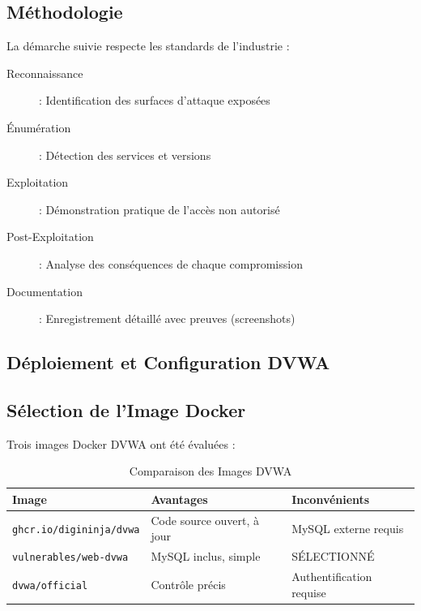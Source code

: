 \documentclass[12pt,a4paper,openany]{report}
\begin{document}
	\subsection{Méthodologie}
	
	La démarche suivie respecte les standards de l'industrie :
	
	\begin{description}
		\item[Reconnaissance] : Identification des surfaces d'attaque exposées
		\item[Énumération] : Détection des services et versions
		\item[Exploitation] : Démonstration pratique de l'accès non autorisé
		\item[Post-Exploitation] : Analyse des conséquences de chaque compromission
		\item[Documentation] : Enregistrement détaillé avec preuves (screenshots)
	\end{description}
	
	
	\subsection{Déploiement et Configuration DVWA}
	
	\subsection{Sélection de l'Image Docker}
	
	Trois images Docker DVWA ont été évaluées :
	
	\begin{table}[ht]
		\centering
		\small
		\renewcommand{\arraystretch}{1.6}
		\begin{tabular}{p{4.5cm} p{3.5cm} p{4.5cm}}
			\hline
			\rowcolor{tableheadbg}
			\textcolor{tableheadfg}{\textbf{Image}} &
			\textcolor{tableheadfg}{\textbf{Avantages}} &
			\textcolor{tableheadfg}{\textbf{Inconvénients}} \\
			\hline
			\rowcolor{tablerowalt}
			\texttt{ghcr.io/digininja/dvwa} & Code source ouvert, à jour & MySQL externe requis \\
			
			\texttt{vulnerables/web-dvwa} & MySQL inclus, simple & \checkmark SÉLECTIONNÉ \\
			
			\rowcolor{tablerowalt}
			\texttt{dvwa/official} & Contrôle précis & Authentification requise \\
			\hline
		\end{tabular}
		\caption{Comparaison des Images DVWA}
		\label{tab:dvwa-images}
	\end{table}
	
\end{document}
